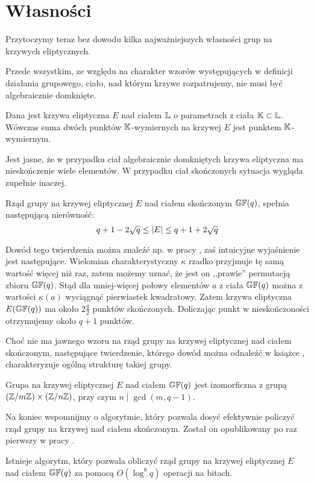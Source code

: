 \section{Własności}

\noindent
Przytoczymy teraz bez dowodu kilka najważniejszych własności
grup na krzywych eliptycznych.

\noindent
Przede wszystkim, ze względu na charakter wzorów występujących
w definicji działania grupowego,
ciało, nad którym krzywe rozpatrujemy, nie musi być algebraicznie domknięte.

\begin{fact}
Dana jest krzywa eliptyczna $E$ nad ciałem $\mathbb{L}$
o parametrach z ciała $\mathbb{K} \subset \mathbb{L}$.
Wówczas suma dwóch punktów $\mathbb{K}$-wymiernych na krzywej $E$
jest punktem $\mathbb{K}$-wymiernym.
\end{fact}

\noindent
Jest jasne, że w przypadku ciał algebraicznie domkniętych krzywa eliptyczna
ma nieskończenie wiele elementów.
W przypadku ciał skończonych sytuacja wygląda zupełnie inaczej.

\begin{theorem}[Hasse]
Rząd grupy na krzywej eliptycznej $E$
nad ciałem skończonym $\mathbb{GF}(q)$,
spełnia następującą nierówność:
\begin{equation}
q + 1 - 2\sqrt{q} \leq \lvert E\rvert \leq q + 1 + 2\sqrt{q}
\end{equation}
\end{theorem}

\noindent
Dowód tego twierdzenia można znaleźć np. w pracy \cite{ecintro1},
zaś intuicyjne wyjaśnienie jest następujące.
Wielomian charakterystyczny $\kappa$ rzadko przyjmuje tę samą wartość
więcej niż raz, zatem możemy uznać, że jest on ,,prawie''
permutacją zbioru $\mathbb{GF}(q)$.
Stąd dla mniej-więcej połowy elementów $a$ z ciała $\mathbb{GF}(q)$
można z wartości $\kappa(a)$ wyciągnąć pierwiastek kwadratowy.
Zatem krzywa eliptyczna $E(\mathbb{GF}(q))$ ma około $2\frac{q}{2}$ punktów skończonych.
Doliczając punkt w nieskończoności otrzymujemy około $q + 1$ punktów.

\noindent
Choć nie ma jawnego wzoru
na rząd grupy na krzywej eliptycznej nad ciałem skończonym,
następujące twierdzenie,
którego dowód można odnaleźć w książce \cite{tsfasmanvladutnogin},
charakteryzuje ogólną strukturę takiej grupy.

\begin{theorem}\label{finite_curve_structure_theorem}
Grupa na krzywej eliptycznej $E$ nad ciałem $\mathbb{GF}(q)$
jest izomorficzna z grupą $(\mathbb{Z}/m\mathbb{Z}) \times (\mathbb{Z}/n\mathbb{Z})$,
przy czym $n \mid \gcd(m, q-1)$.
\end{theorem}

\noindent
Na koniec wspomnijmy o algorytmie,
który pozwala dosyć efektywnie policzyć
rząd grupy na krzywej nad ciałem skończonym.
Został on opublikowany po raz pierwszy w pracy \cite{schoof}.

\begin{theorem}[Schoof]
Istnieje algorytm, który pozwala obliczyć rząd grupy
na krzywej eliptycznej $E$ nad ciałem $\mathbb{GF}(q)$
za pomocą $O(\log^8 q)$ operacji na bitach.
\end{theorem}
